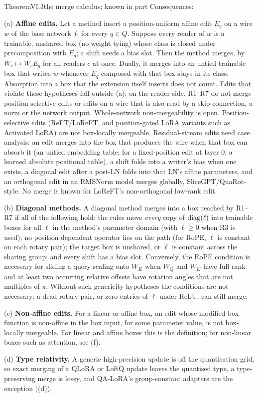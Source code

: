 \begin{restate}{Theorem}{VI.3}{the merge calculus; known in part}
Consequences:

(a) \textbf{Affine edits.} Let a method insert a position-uniform affine edit $E_q$ on a wire $w$ of the base network $f$,
for every $q\in Q$. Suppose every reader of $w$ is a trainable, unshared box (no weight tying) whose class is closed under
precomposition with $E_q$; a shift needs a bias slot. Then the method merges, by $W_c\mapsto W_cE_q$ for all readers $c$ at
once. Dually, it merges into an untied trainable box that writes $w$ whenever $E_q$ composed with that box stays in its
class. Absorption into a box that the extension itself inserts does not count. Edits that violate these hypotheses fall
outside (a): on the reader side, R1--R7 do not merge position-selective edits or edits on a wire that is also read by a skip
connection, a norm or the network output. Whole-network non-mergeability is open. Position-selective edits (ReFT/LoReFT, and
position-gated LoRA variants such as Activated LoRA) are not box-locally mergeable. Residual-stream edits need case
analysis: an edit merges into the box that produces the wire when that box can absorb it (an untied embedding table; for a
fixed-position edit at layer $0$, a learned absolute positional table), a shift folds into a writer's bias when one exists,
a diagonal edit after a post-LN folds into that LN's affine parameters, and an orthogonal edit in an RMSNorm model merges
globally, SliceGPT/QuaRot-style. No merge is known for LoReFT's non-orthogonal low-rank edit.

(b) \textbf{Diagonal methods.} A diagonal method merges into a box reached by R1--R7 if all of the following hold: the rules
move \emph{every} copy of $\operatorname{diag}(\ell)$ into trainable boxes for all $\ell$ in the method's parameter domain (with $\ell\ge0$
when R3 is used); no position-dependent operator lies on the path (for RoPE, $\ell$ is constant on each rotary pair); the
target box is unshared, or $\ell$ is constant across the sharing group; and every shift has a bias slot. Conversely, the
RoPE condition is necessary for sliding a query scaling onto $W_K$ when $W_Q$ and $W_K$ have full rank and at least two
occurring relative offsets have rotation angles that are not multiples of $\pi$. Without such genericity hypotheses the
conditions are not necessary: a dead rotary pair, or zero entries of $\ell$ under ReLU, can still merge.

(c) \textbf{Non-affine edits.} For a linear or affine box, an edit whose modified box function is non-affine in the box
input, for some parameter value, is not box-locally mergeable. For linear and affine boxes this is the definition; for
non-linear boxes such as attention, see (f).

(d) \textbf{Type relativity.} A generic high-precision update is off the quantisation grid, so exact merging of a QLoRA or
LoftQ update leaves the quantised type, a type-preserving merge is lossy, and QA-LoRA's group-constant adapters are the
exception ((d)).
\end{restate}

